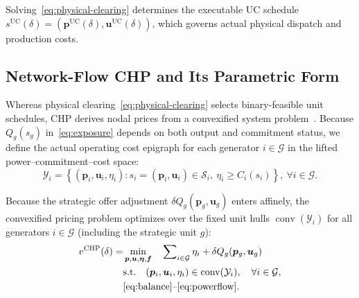 \documentclass[journal]{IEEEtran}
\DeclareMathOperator{\conv}{conv}
\newcommand{\bp}{\bm p}
\newcommand{\bu}{\bm u}
\newcommand{\UC}{\mathrm{UC}}
\newcommand{\CHP}{\mathrm{CHP}}
\begin{document}
Solving~\eqref{eq:physical-clearing} determines the executable UC schedule $s^{\UC}(\delta)=(\bp^{\UC}(\delta),\bu^{\UC}(\delta))$, which governs actual physical dispatch and production costs.

\subsection{Network-Flow CHP and Its Parametric Form}
\label{subsec:dag-model}
Whereas physical clearing~\eqref{eq:physical-clearing} selects binary-feasible unit schedules, CHP derives nodal prices from a convexified system problem~\cite{gribik2007,hua2017}. Because $Q_g(s_g)$ in~\eqref{eq:exposure} depends on both output and commitment status, we define the actual operating cost epigraph for each generator $i\in\mathcal{G}$ in the lifted power--commitment--cost space:
\begin{equation}
\mathcal{Y}_i \!\!=\!\! \left\{ (\bp_i,\bu_i,\eta_i) \!\!:\!\! s_i\!\!=\!\!(\bp_i,\bu_i)\!\!\in\!\!\mathcal{S}_i,\ \eta_i\!\!\ge\!\! C_i(s_i) \right\}, \ \forall i\in\mathcal{G}.\label{eq:unit-hull}
\end{equation}

Because the strategic offer adjustment $\delta Q_g(\bp_g,\bu_g)$ enters affinely, the convexified pricing problem optimizes over the fixed unit hulls $\conv(\mathcal{Y}_i)$ for all generators $i\in\mathcal{G}$ (including the strategic unit $g$):
\begin{subequations}\label{eq:hull-clearing}
\begin{align}
v^{\CHP}(\delta) = &\min_{\bp,\bu,\bm\eta,\bm f}\quad  \sum\nolimits_{i\in\mathcal{G}}\eta_i + \delta Q_g(\bp_g,\bu_g)\\
&\mathrm{s.t.}\quad  (\bp_i,\bu_i,\eta_i)\in\conv(\mathcal{Y}_i), \quad \forall i\in\mathcal{G},\\
& \eqref{eq:balance}\text{--}\eqref{eq:powerflow}.\notag
\end{align}
\end{subequations}
\end{document}
